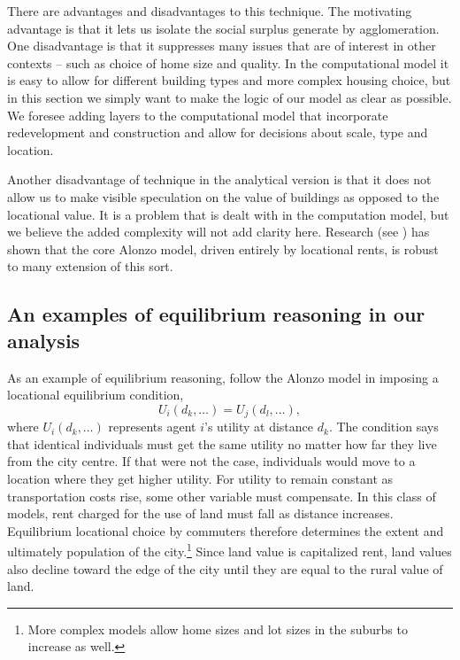 {There are advantages and disadvantages to this technique. The motivating advantage is that it lets us isolate the social surplus generate by agglomeration. One disadvantage is that it suppresses many issues that are of interest in other contexts -- such as choice of home size and quality. In the computational model it is easy to allow for different building types and more complex housing choice, but in this section we simply  want to make the logic of our model as clear as possible. We foresee adding layers to the computational model that incorporate redevelopment and construction and allow for decisions about scale, type and location. 

Another disadvantage of technique in the analytical version is that it does not allow us to make visible speculation on  the value of  buildings as opposed to the locational value. It is a problem that is dealt with in the computation model, but we believe the added complexity will not add clarity here. Research (see \cite{mcdonaldWilliamAlonsoRichard2007}) has shown  that the core \gls{Alonzo model}, driven entirely by locational rents,  is robust to many extension of this sort. 

\subsection{An examples of  \gls{equilibrium reasoning} in our analysis}

As an example of \gls{equilibrium reasoning}, follow the \Gls{Alonzo model} in imposing a locational equilibrium condition,
\[U_i(d_k,\dots)=U_j(d_l, \dots),\]where $U_i(d_k,\dots)$ represents agent $i$'s utility at distance $d_k$. 
The condition says that identical individuals must get the same utility no matter how far they live from the city centre. If that were not the case, individuals would move to a location where they get higher utility. For utility to remain constant as  transportation costs  rise, some other variable must compensate. In this class of models, rent charged for the use of land must fall as distance increases. Equilibrium locational choice by commuters therefore determines the extent and ultimately  population of the city.\footnote{More complex models allow home sizes and lot sizes in the suburbs to increase as well.} Since land value  is \gls{capitalize}d rent, land values also decline toward the edge of the city until they are equal to the rural value of land. 

}
